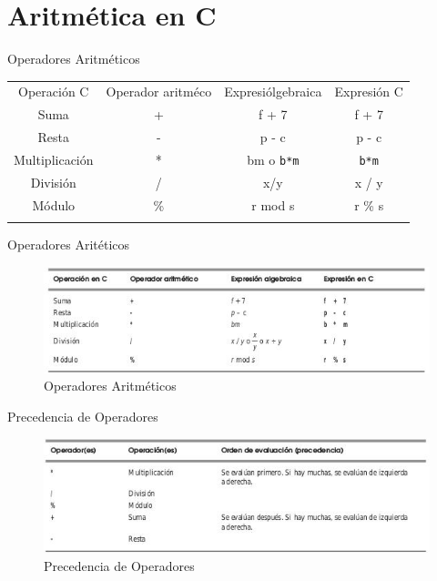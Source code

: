 \section{Aritmética en C}\label{aritmuxe9tica-en-c}

\begin{frame}{Operadores Aritméticos}

\begin{longtable}[c]{@{}cccc@{}}
\toprule\addlinespace
Operación C & Operador aritméco & Expresiólgebraica & Expresión C
\\\addlinespace
\midrule\endhead
Suma & + & f + 7 & f + 7
\\\addlinespace
Resta & - & p - c & p - c
\\\addlinespace
Multiplicación & * & bm o \texttt{b*m} & \texttt{b*m}
\\\addlinespace
División & / & x/y & x / y
\\\addlinespace
Módulo & \% & r mod s & r \% s
\\\addlinespace
\bottomrule
\end{longtable}

\end{frame}

\begin{frame}{Operadores Aritéticos}

\begin{figure}[htbp]
\centering
\includegraphics{operadores-aritmeticos.jpg}
\caption{Operadores Aritméticos}
\end{figure}

\end{frame}

\begin{frame}{Precedencia de Operadores}

\begin{figure}[htbp]
\centering
\includegraphics{precedencia-operadores.jpg}
\caption{Precedencia de Operadores}
\end{figure}

\end{frame}

